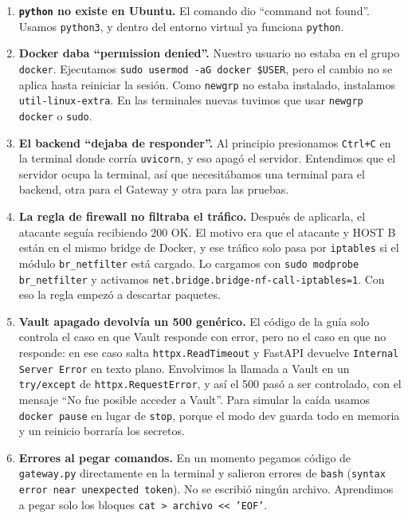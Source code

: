 \documentclass[11pt,a4paper]{article}
\begin{document}
\begin{enumerate}
  \item \textbf{\texttt{python} no existe en Ubuntu.} El comando dio ``command not found''. Usamos \texttt{python3}, y dentro del entorno virtual ya funciona \texttt{python}.

  \item \textbf{Docker daba ``permission denied''.} Nuestro usuario no estaba en el grupo \texttt{docker}. Ejecutamos \texttt{sudo usermod -aG docker \$USER}, pero el cambio no se aplica hasta reiniciar la sesión. Como \texttt{newgrp} no estaba instalado, instalamos \texttt{util-linux-extra}. En las terminales nuevas tuvimos que usar \texttt{newgrp docker} o \texttt{sudo}.

  \item \textbf{El backend ``dejaba de responder''.} Al principio presionamos \texttt{Ctrl+C} en la terminal donde corría \texttt{uvicorn}, y eso apagó el servidor. Entendimos que el servidor ocupa la terminal, así que necesitábamos una terminal para el backend, otra para el Gateway y otra para las pruebas.

  \item \textbf{La regla de firewall no filtraba el tráfico.} Después de aplicarla, el atacante seguía recibiendo 200 OK. El motivo era que el atacante y HOST B están en el mismo bridge de Docker, y ese tráfico solo pasa por \texttt{iptables} si el módulo \texttt{br\_netfilter} está cargado. Lo cargamos con \texttt{sudo modprobe br\_netfilter} y activamos \texttt{net.bridge.bridge-nf-call-iptables=1}. Con eso la regla empezó a descartar paquetes.

  \item \textbf{Vault apagado devolvía un 500 genérico.} El código de la guía solo controla el caso en que Vault responde con error, pero no el caso en que no responde: en ese caso salta \texttt{httpx.ReadTimeout} y FastAPI devuelve \texttt{Internal Server Error} en texto plano. Envolvimos la llamada a Vault en un \texttt{try/except} de \texttt{httpx.RequestError}, y así el 500 pasó a ser controlado, con el mensaje ``No fue posible acceder a Vault''. Para simular la caída usamos \texttt{docker pause} en lugar de \texttt{stop}, porque el modo dev guarda todo en memoria y un reinicio borraría los secretos.

  \item \textbf{Errores al pegar comandos.} En un momento pegamos código de \texttt{gateway.py} directamente en la terminal y salieron errores de \texttt{bash} (\texttt{syntax error near unexpected token}). No se escribió ningún archivo. Aprendimos a pegar solo los bloques \texttt{cat > archivo << 'EOF'}.
\end{enumerate}
\end{document}

